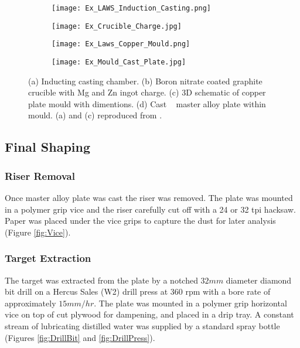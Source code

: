\documentclass[a4paper,12pt,oneside]{report}%
\begin{document}
\begin{figure}[htbp]
	\centering
	\begin{subfigure}[htbp]{0.49\textwidth}
		\texttt{[image: Ex\_LAWS\_Induction\_Casting.png]}
		\caption{}
		\label{fig:LawsCasting}
	\end{subfigure}
	\begin{subfigure}[htbp]{0.375\textwidth}
		\texttt{[image: Ex\_Crucible\_Charge.jpg]}
		\caption{}
		\label{fig:CrucibleCharge}
	\end{subfigure}
	\begin{subfigure}[htbp]{0.41\textwidth}
		\texttt{[image: Ex\_Laws\_Copper\_Mould.png]}
		\caption{}
		\label{fig:LawsMould}
	\end{subfigure}
	\begin{subfigure}[htbp]{0.49\textwidth}
		\texttt{[image: Ex\_Mould\_Cast\_Plate.jpg]}
		\caption{}
		\label{fig:FilledMould}
	\end{subfigure}
	\caption[(a) Inducting casting chamber. (b) Boron nitrate coated graphite crucible with Mg and Zn ingot charge. (c) 3D schematic of copper plate mould with dimentions. (d) Cast \MgZnCa~ master alloy plate within mould.]{(a) Inducting casting chamber. (b) Boron nitrate coated graphite crucible with Mg and Zn ingot charge. (c) 3D schematic of copper plate mould with dimentions. (d) Cast \MgZnCa~ master alloy plate within mould. (a) and (c) reproduced from \cite{Laws2007}.}%
	\label{fig:Induction}
\end{figure}

\subsection{Final Shaping}
\subsubsection{Riser Removal} \label{sec:RiserRemoval}
Once master alloy plate was cast the riser was removed. The plate was mounted in a polymer grip vice and the riser carefully cut off with a 24 or 32 \acrshort{tpi} hacksaw. Paper was placed under the vice grips to capture the dust for later analysis (Figure \ref{fig:Vice}).

\subsubsection{Target Extraction}
The target was extracted from the plate by a notched $32 mm$ diameter diamond bit drill on a Hercus Sales (W2) drill press at 360 \acrshort{rpm} with a bore rate of approximately $15mm/hr$. The plate was mounted in a polymer grip horizontal vice on top of cut plywood for dampening, and placed in a drip tray. A constant stream of lubricating distilled water was supplied by a standard spray bottle (Figures \ref{fig:DrillBit} and \ref{fig:DrillPress}).
\end{document}
